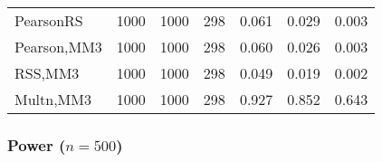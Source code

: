 \documentclass[
]{article}
\begin{document}
\begin{table}[H]
{\begin{tabular}[t]{lrrrrrr}
\hspace{1em}PearsonRS & 1000 & 1000 & 298 & 0.061 & 0.029 & 0.003\\
\hspace{1em}Pearson,MM3 & 1000 & 1000 & 298 & 0.060 & 0.026 & 0.003\\
\hspace{1em}RSS,MM3 & 1000 & 1000 & 298 & 0.049 & 0.019 & 0.002\\
\hspace{1em}Multn,MM3 & 1000 & 1000 & 298 & 0.927 & 0.852 & 0.643\\
\bottomrule
\end{tabular}}
\end{table}

\hypertarget{power-n500-3}{%
\subsubsection{\texorpdfstring{Power
(\(n=500\))}{Power (n=500)}}\label{power-n500-3}}
\end{document}
